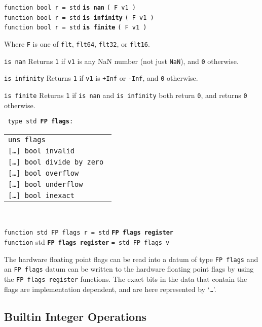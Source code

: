 \documentclass[12pt]{article}
\newcommand{\ttkey}[1]{{\tt \bfseries #1}}
\newenvironment{indpar}[1][0.3in]%
	{\begin{list}{}%
		     {\setlength{\itemsep}{0in}%
		      \setlength{\topsep}{0in}%
		      \setlength{\parsep}{1ex}%
		      \setlength{\labelwidth}{#1}%
		      \setlength{\leftmargin}{#1}%
		      \addtolength{\leftmargin}{\labelsep}}%
	 \item}%
	{\end{list}}
\newenvironment{itemlist}[1][1.2in]%
	{\begin{list}{}{\setlength{\labelwidth}{#1}%
		        \setlength{\leftmargin}{\labelwidth}%
		        \addtolength{\leftmargin}{+0.2in}%
		        \renewcommand{\makelabel}[1]{##1\hfill}}}%
	{\end{list}}
\begin{document}
{\tt function bool r = std} \ttkey{is nan} {\tt ( F v1 )} \\
{\tt function bool r = std} \ttkey{is infinity} {\tt ( F v1 )} \\
{\tt function bool r = std} \ttkey{is finite} {\tt ( F v1 )}
\begin{indpar}
Where {\tt F} is one of {\tt flt}, {\tt flt64}, {\tt flt32}, or {\tt flt16}.
\begin{itemlist}
\item[\tt is nan]
Returns {\tt 1} if {\tt v1} is any NaN number (not just {\tt NaN}), and {\tt 0}
otherwise.
\item[\tt is infinity]
Returns {\tt 1} if {\tt v1} is {\tt +Inf} or {\tt -Inf}, and {\tt 0}
otherwise.
\item[\tt is finite]
Returns {\tt 1} if {\tt is nan} and {\tt is infinity} both return {\tt 0},
and returns {\tt 0} otherwise.
\end{itemlist}
\end{indpar}

{\tt
type~std~\ttkey{FP flags}: \\
\begin{tabular}[t]{@{~~~~~}l}
\tt uns flags \\
\tt [\ldots] bool invalid \\
\tt [\ldots] bool divide by zero \\
\tt [\ldots] bool overflow \\
\tt [\ldots] bool underflow \\
\tt [\ldots] bool inexact \\
\end{tabular} \\
}
{\tt function std FP flags r = std} \ttkey{FP flags register} \\
{\tt function} std \ttkey{FP flags register} {\tt = std FP flags v}
\begin{indpar}
The hardware floating point flags can be read into a datum of type
{\tt FP flags} and an {\tt FP flags} datum can be written
to the hardware floating point flags by using the {\tt FP flags register}
functions.  The exact bits in the data that contain the flags
are implementation dependent, and are here represented by `{\tt \ldots{}}'.
\end{indpar}

\subsection{Builtin Integer Operations}
\label{BUILTIN-INTEGER-OPERATIONS}
\end{document}
